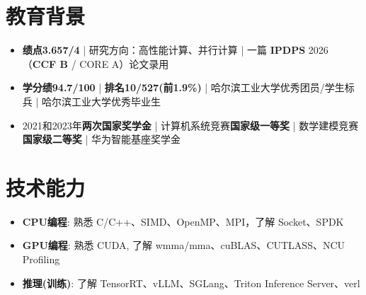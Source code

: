 \documentclass{resume}
\begin{document}
\small 
{}

 

\section{教育背景}
\begin{itemize}
  \item \textbf{绩点3.657/4} | 研究方向：高性能计算、并行计算 | 一篇 \textbf{IPDPS} 2026 （\textbf{CCF B} / CORE A）论文录用
\end{itemize}
\begin{itemize}
  \item \textbf{学分绩94.7/100} | \textbf{排名10/527(前1.9\%)} | 哈尔滨工业大学优秀团员/学生标兵 | 哈尔滨工业大学优秀毕业生
  \item 2021和2023年\textbf{两次国家奖学金} | 计算机系统竞赛\textbf{国家级一等奖} | 数学建模竞赛\textbf{国家级二等奖} | 华为智能基座奖学金 
\end{itemize}

\section{技术能力}
\begin{itemize}[parsep=0.2ex]
  \item \textbf{CPU编程}: 熟悉 C/C++、SIMD、OpenMP、MPI，了解 Socket、SPDK
  \item \textbf{GPU编程}: 熟悉 CUDA, 了解 wmma/mma、cuBLAS、CUTLASS、NCU Profiling
  \item \textbf{推理(训练)}: 了解 TensorRT、vLLM、SGLang、Triton Inference Server、verl
\end{itemize}
\end{document}
